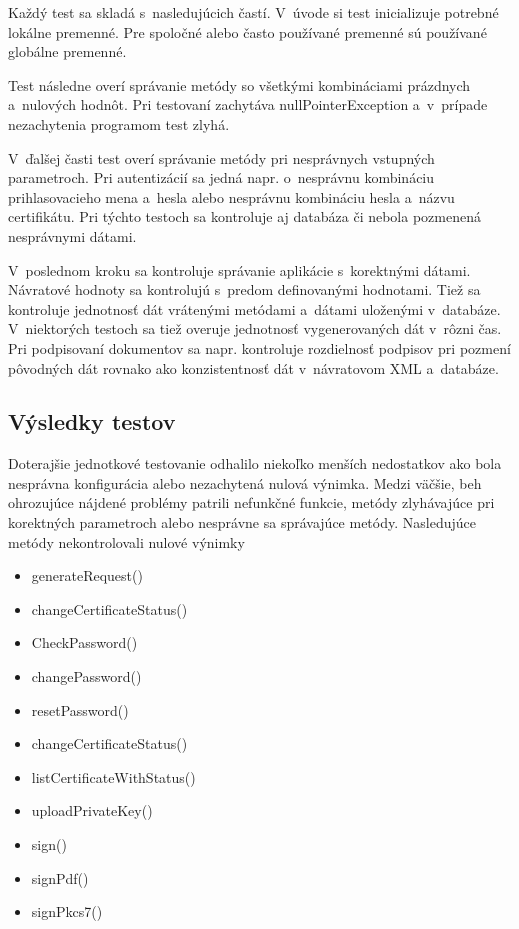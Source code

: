 \documentclass[
  digital, %
  table,   %
oneside,
  nolof,     %
  nolot,     %
]{fithesis3}
\begin{document}
Každý test sa skladá s~nasledujúcich častí. V~úvode si test inicializuje potrebné lokálne premenné. Pre spoločné alebo často používané premenné sú používané globálne premenné. 

Test následne overí správanie metódy so všetkými kombináciami prázdnych a~nulových hodnôt. Pri testovaní zachytáva nullPointerException a~v~prípade nezachytenia programom test zlyhá.

 V~ďalšej časti test overí správanie metódy pri nesprávnych vstupných parametroch. Pri autentizácií sa jedná napr. o~nesprávnu kombináciu prihlasovacieho mena a~hesla alebo nesprávnu kombináciu hesla a~názvu certifikátu. Pri týchto testoch sa kontroluje aj databáza či nebola pozmenená nesprávnymi dátami.
 
  V~poslednom kroku sa kontroluje správanie aplikácie s~korektnými dátami. Návratové hodnoty sa kontrolujú s~predom definovanými hodnotami. Tiež sa kontroluje jednotnosť dát vrátenými metódami a~dátami uloženými v~databáze. V~niektorých testoch sa tiež overuje jednotnosť vygenerovaných dát v~rôzni čas. Pri podpisovaní dokumentov sa napr. kontroluje rozdielnosť podpisov pri pozmení pôvodných dát rovnako ako konzistentnosť dát v~návratovom XML a~databáze.   

\subsection{Výsledky testov}
Doterajšie jednotkové testovanie odhalilo niekoľko menších nedostatkov ako bola nesprávna konfigurácia alebo nezachytená nulová výnimka. Medzi väčšie, beh ohrozujúce nájdené problémy patrili nefunkčné funkcie, metódy zlyhávajúce pri korektných parametroch alebo nesprávne sa správajúce metódy.  
Nasledujúce metódy nekontrolovali nulové výnimky 

\begin{itemize}

\item generateRequest()
\item changeCertificateStatus()
\item CheckPassword()
\item changePassword()
\item resetPassword()
\item changeCertificateStatus()
\item listCertificateWithStatus()
\item uploadPrivateKey()
\item sign()
\item signPdf()
\item signPkcs7()
 \end{itemize}
\end{document}
